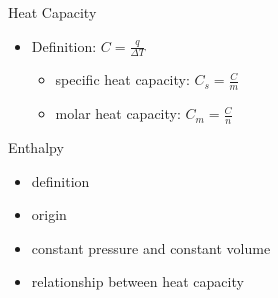 \documentclass[12pt,compress]{beamer}
\begin{document}
\begin{frame}{Heat Capacity}
	\begin{itemize}
		\item Definition: $C = \frac{q}{\Delta T}$
			\begin{itemize}
				\item specific heat capacity: $C_s = \frac{C}{m}$
				\item molar heat capacity: $C_m = \frac{C}{n}$
			\end{itemize}
	\end{itemize}

\end{frame}
\begin{frame}{Enthalpy}
	\begin{itemize}
		\item definition
		\item origin
		\item constant pressure and constant volume
		\item relationship between heat capacity
	\end{itemize}
\end{frame}
\end{document}
